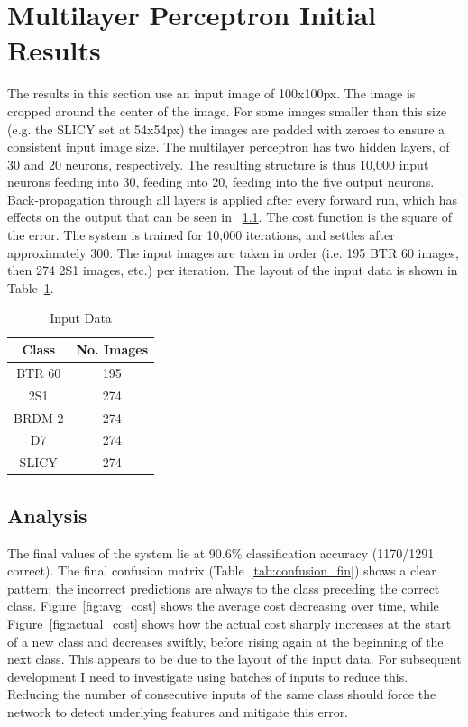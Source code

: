 \section{Multilayer Perceptron Initial Results}
The results in this section use an input image of 100x100px. The image is cropped around the center of the image. For some images smaller than this size (e.g. the SLICY set at 54x54px) the images are padded with zeroes to ensure a consistent input image size. The multilayer perceptron has two hidden layers, of 30 and 20 neurons, respectively. The resulting structure is thus 10,000 input neurons feeding into 30, feeding into 20, feeding into the five output neurons. Back-propagation through all layers is applied after every forward run, which has effects on the output that can be seen in ~\ref{sec:analysis}. The cost function is the square of the error. The system is trained for 10,000 iterations, and settles after approximately 300. The input images are taken in order (i.e. 195 BTR 60 images, then 274 2S1 images, etc.) per iteration. The layout of the input data is shown in Table~\ref{tab:input_data}. \\


\begin{table}
	\centering
	\begin{tabular}{|c|c|}
		\hline
		\textbf{Class} & \textbf{No. Images} \\
		\hline
		
		BTR 60 & 195 \\ \hline
		2S1    & 274 \\ \hline
		BRDM 2 & 274 \\ \hline
		D7     & 274 \\ \hline
		SLICY  & 274 \\ \hline
			
	\end{tabular}
	\caption{Input Data}
	\label{tab:input_data}
	\centering
\end{table}

 

\subsection{Analysis}\label{sec:analysis}

The final values of the system lie at 90.6\% classification accuracy (1170/1291 correct). The final confusion matrix (Table~\ref{tab:confusion_fin}) shows a clear pattern; the incorrect predictions are always to the class preceding the correct class. Figure~\ref{fig:avg_cost} shows the average cost decreasing over time, while Figure~\ref{fig:actual_cost} shows how the actual cost sharply increases at the start of a new class and decreases swiftly, before rising again at the beginning of the next class. This appears to be due to the layout of the input data. For subsequent development I need to investigate using batches of inputs to reduce this. Reducing the number of consecutive inputs of the same class should force the network to detect underlying features and mitigate this error.

